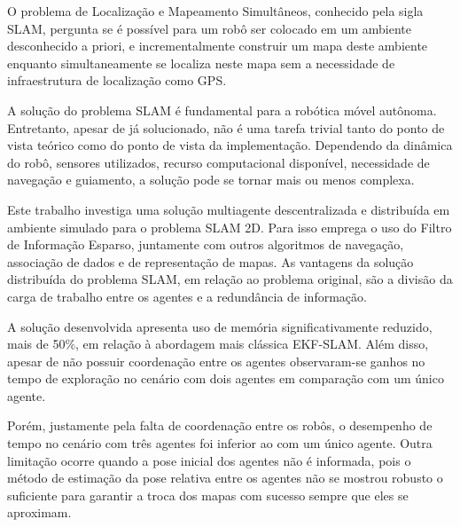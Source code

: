 O problema de Localização e Mapeamento Simultâneos, conhecido pela sigla SLAM, pergunta se é possível para um robô ser colocado em um ambiente 
desconhecido a priori, e incrementalmente construir um mapa deste 
ambiente enquanto simultaneamente se localiza neste mapa sem a 
necessidade de infraestrutura de localização como GPS.

A solução do problema SLAM é fundamental para a robótica móvel 
autônoma. Entretanto, apesar de já solucionado, não é uma tarefa trivial 
tanto do ponto de vista teórico como do ponto de vista da implementação. 
Dependendo da dinâmica do robô, sensores utilizados, recurso 
computacional disponível, necessidade de navegação e guiamento, a solução 
pode se tornar mais ou menos complexa.

Este trabalho investiga uma solução multiagente descentralizada e distribuída em ambiente simulado 
para o problema SLAM 2D. Para isso emprega o uso do Filtro de Informação 
Esparso, juntamente com outros algoritmos de navegação, associação de 
dados e de representação de mapas. As vantagens da solução distribuída do 
problema SLAM, em relação ao problema original, são a divisão da carga 
de trabalho entre os agentes e a redundância de informação.

A solução desenvolvida apresenta uso de memória significativamente 
reduzido, mais de 50\%, em relação à abordagem mais clássica EKF-SLAM. 
Além disso, apesar de não possuir coordenação entre os agentes 
observaram-se ganhos no tempo de exploração no cenário com dois agentes 
em comparação com um único agente.

Porém, justamente pela falta de 
coordenação entre os robôs, o desempenho de tempo no cenário com 
três agentes foi inferior ao com um único agente. Outra limitação ocorre 
quando a pose inicial dos agentes não é informada, pois o método de 
estimação da pose relativa entre os agentes não se mostrou robusto o 
suficiente para garantir a troca dos mapas com sucesso sempre que eles se 
aproximam.